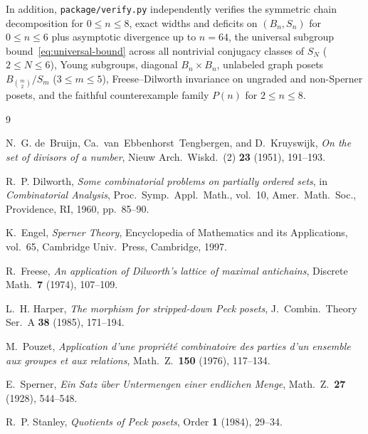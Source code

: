 \documentclass[11pt,a4paper]{article}
\theoremstyle{definition}
\newcommand{\Bn}{B_n}
\newcommand{\Sn}{S_n}
\begin{document}
In addition, \texttt{package/verify.py} independently verifies the symmetric chain decomposition for $0 \le n \le 8$, exact widths and deficits on $(\Bn, \Sn)$ for $0 \le n \le 6$ plus asymptotic divergence up to $n = 64$, the universal subgroup bound~\eqref{eq:universal-bound} across all nontrivial conjugacy classes of $S_N$ ($2 \le N \le 6$), Young subgroups, diagonal $\Bn \times \Bn$, unlabeled graph posets $B_{\binom{m}{2}}/S_m$ ($3 \le m \le 5$), Freese--Dilworth invariance on ungraded and non-Sperner posets, and the faithful counterexample family $P(n)$ for $2 \le n \le 8$.

\begin{thebibliography}{9}\setlength{\itemsep}{2pt}

N.~G. de~Bruijn, Ca.~van~Ebbenhorst~Tengbergen, and D.~Kruyswijk,
\emph{On the set of divisors of a number},
Nieuw Arch.\ Wiskd.\ (2) \textbf{23} (1951), 191--193.

R.~P. Dilworth,
\emph{Some combinatorial problems on partially ordered sets},
in \emph{Combinatorial Analysis}, Proc.\ Symp.\ Appl.\ Math., vol.~10, Amer.\ Math.\ Soc., Providence, RI, 1960, pp.~85--90.

K.~Engel,
\emph{Sperner Theory},
Encyclopedia of Mathematics and its Applications, vol.~65, Cambridge Univ.\ Press, Cambridge, 1997.

R.~Freese,
\emph{An application of Dilworth's lattice of maximal antichains},
Discrete Math.\ \textbf{7} (1974), 107--109.

L.~H. Harper,
\emph{The morphism for stripped-down Peck posets},
J.~Combin.\ Theory Ser.~A \textbf{38} (1985), 171--194.

M.~Pouzet,
\emph{Application d'une propri\'et\'e combinatoire des parties d'un ensemble aux groupes et aux relations},
Math.~Z.\ \textbf{150} (1976), 117--134.

E.~Sperner,
\emph{Ein Satz \"uber Untermengen einer endlichen Menge},
Math.~Z.\ \textbf{27} (1928), 544--548.

R.~P. Stanley,
\emph{Quotients of Peck posets},
Order \textbf{1} (1984), 29--34.

\end{thebibliography}
\end{document}
